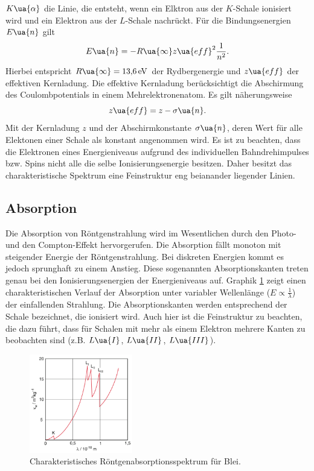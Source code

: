 $K\ua{\alpha}$ die Linie, die entsteht, wenn ein Elktron aus der $K$-Schale ionisiert wird und ein Elektron aus der $L$-Schale
nachrückt. Für die Bindungsenergien $E\ua{n}$ gilt
\begin{equation}
  E\ua{n} = -R\ua{\infty} z\ua{eff}^2 \frac{1}{n^2}.
  \label{eq: E_niveaus}
\end{equation}
Hierbei entspricht $R\ua{\infty} = \SI{13.6}{\eV}$ der Rydbergenergie und $z\ua{eff}$ der effektiven Kernladung. Die effektive
Kernladung berücksichtigt die Abschirmung des Coulombpotentials in einem Mehrelektronenatom. Es gilt näherungsweise
\begin{equation}
  z\ua{eff} = z - \sigma\ua{n}.
  \label{eq: abschirmkonstante}
\end{equation}
Mit der Kernladung $z$ und der Abschirmkonstante $\sigma\ua{n}$, deren Wert für alle Elektonen einer Schale als konstant angenommen wird.
Es ist zu beachten, dass die Elektronen eines Energieniveaus
aufgrund des individuellen Bahndrehimpulses bzw. Spins nicht alle die selbe Ionisierungsenergie besitzen. Daher besitzt das charakteristische
Spektrum eine Feinstruktur eng beianander liegender Linien.

\subsection{Absorption}
Die Absorption von Röntgenstrahlung wird im Wesentlichen durch den Photo- und den Compton-Effekt hervorgerufen. Die Absorption
fällt monoton mit steigender Energie der Röntgenstrahlung. Bei diskreten Energien kommt es jedoch sprunghaft zu einem Anstieg. Diese
sogenannten Absorptionskanten treten genau bei den Ionisierungsenergien der Energieniveaus auf. Graphik \ref{fig: absorption} zeigt einen charakteristischen
Verlauf der Absorption unter variabler Wellenlänge ($E \propto \frac{1}{\lambda}$) der einfallenden Strahlung.
Die Absorptionskanten werden entsprechend der Schale bezeichnet, die ionisiert wird.
Auch hier ist die Feinstruktur zu beachten, die dazu
führt, dass für Schalen mit mehr als einem Elektron mehrere Kanten zu beobachten sind (z.B. $L\ua{I}$, $L\ua{II}$, $L\ua{III}$).
\begin{figure}[H]
  \centering
  \includegraphics[width = 0.4\textwidth]{pics/absorption.png}
  \caption{Charakteristisches Röntgenabsorptionsspektrum für Blei\cite{}.}
  \label{fig: absorption}
\end{figure}

